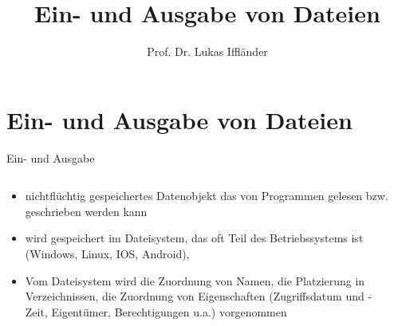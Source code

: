\documentclass[xelatex,aspectratio=169]{beamer}
\title{Ein- und Ausgabe von Dateien}
\author{Prof. Dr. Lukas Iffländer}
\institute{HTW Dresden}
\date{}
\begin{document}
\begin{frame}
    \titlepage
\end{frame}

\section{Ein- und Ausgabe von Dateien}

\begin{frame}{Ein- und Ausgabe}
    \begin{columns}
        \begin{column}{0.5\textwidth}
            \begin{itemize}
                \item nichtflüchtig gespeichertes Datenobjekt das von Programmen gelesen bzw. geschrieben werden kann
                \item wird gespeichert im Dateisystem, das oft Teil des Betriebssystems ist (Windows, Linux, IOS, Android),
                \item Vom Dateisystem wird die Zuordnung von Namen, die Platzierung in Verzeichnissen, die Zuordnung von Eigenschaften (Zugriffsdatum und -Zeit, Eigentümer, Berechtigungen u.a.) vorgenommen
            \end{itemize}
        \end{column}
        \begin{column}{0.5\textwidth}
        \end{column}
    \end{columns}
\end{frame}
\end{document}
